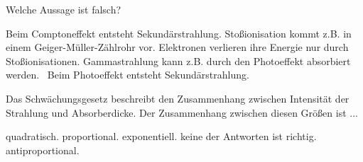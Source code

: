 \documentclass[11pt]{exam}
\begin{document}
\begin{questions}
\vspace{3mm}\question Welche Aussage ist falsch?

\begin{choices}
	\choice Beim Comptoneffekt entsteht Sekundärstrahlung.
	\choice Stoßionisation kommt z.B. in einem Geiger-Müller-Zählrohr vor.
	\choice Elektronen verlieren ihre Energie nur durch Stoßionisationen.
	\choice Gammastrahlung kann z.B. durch den Photoeffekt absorbiert werden.
	\choice  Beim Photoeffekt entsteht Sekundärstrahlung.
\end{choices}

\vspace{3mm}\question Das Schwächungsgesetz beschreibt den Zusammenhang zwischen Intensität der Strahlung und Absorberdicke. Der Zusammenhang zwischen diesen Größen ist ...

\begin{choices}
	\choice quadratisch.
	\choice proportional.
	\choice exponentiell.
	\choice keine der Antworten ist richtig.
	\choice antiproportional.
\end{choices}

\vspace{3mm}\end{questions}
\end{document}
